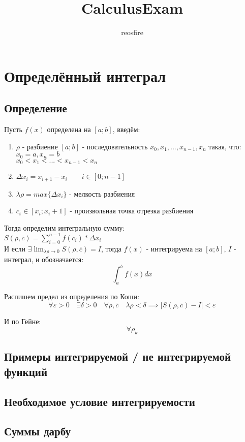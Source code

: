\documentclass[11pt]{article}
\title{CalculusExam}
\author{reosfire}
\begin{document}
    \section{Определённый интеграл}
        \subsection{Определение}
        Пусть $f(x)$ определена на $[a; b]$, введём:
        \begin{enumerate}
            \item $\rho$ - разбиение $[a; b]$ - последовательность $x_0, x_1, ..., x_{n - 1}, x_n$ такая, что:\\
             $x_0 = a, x_n = b$\\
             $x_0 < x_1 < ... < x_{n - 1} < x_n$
            \item $\Delta x_i = x_{i + 1} - x_i \qquad i \in[0; n - 1]$
            \item $\lambda \rho = max\{\Delta x_i\}$ - мелкость разбиения
            \item $c_i \in [x_i; x_i + 1]$ - произвольная точка отрезка разбиения
        \end{enumerate}
        Тогда определим интегральную сумму:\\
        $S(\rho, \overline{c}) = \sum_{i=0}^{n-1} f(c_i)*\Delta x_i$\\
        И если $\exists \lim_{\lambda \rho \to 0} S(\rho, \overline{c}) = I$,
        тогда $f(x)$ - интегрируема на $[a; b]$, $I$ - интеграл, и обозначается: \[\int_{a}^{b}f(x)dx\]
        
        Распишем предел из определения по Коши:
        \[\forall \varepsilon > 0 \quad \exists \delta > 0 \quad \forall \rho, \overline{c} \quad \lambda\rho < \delta \implies |S(\rho, \overline{c}) - I| < \varepsilon\]
        
        И по Гейне:
        \[\forall \rho_k\]

        \subsection{Примеры интегрируемой / не интегрируемой функций}

        \subsection{Необходимое условие интегрируемости}

        \subsection{Суммы дарбу}
\end{document}
